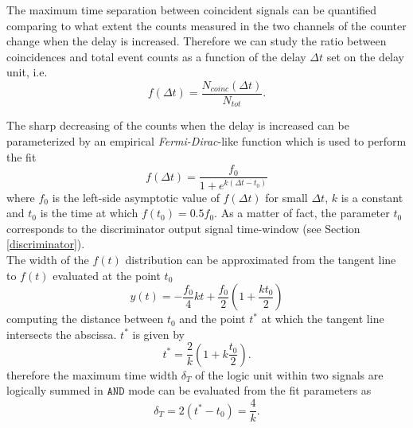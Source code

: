 The maximum time separation between coincident signals can be quantified comparing to what extent the counts measured in the two channels of the counter change when the delay is increased.
Therefore we can study the ratio between coincidences and total event counts as a function of the delay $\Delta t$ set on the delay unit, i.e.
\begin{equation} \label{eq:fermi_dirac}
f(\Delta t) = \frac{N_{coinc}(\Delta t)}{N_{tot}} .
\end{equation}

The sharp decreasing of the counts when the delay is increased can be parameterized by an empirical \emph{Fermi-Dirac}-like function which is used to perform the fit
\begin{equation} \label{eq:fermidirac}
f(\Delta t) = \frac{f_0}{1 + e^{k(\Delta t- t_0)}}
\end{equation}
where $f_0$ is the left-side asymptotic value of $f(\Delta t)$ for small $\Delta t$, $k$ is a constant and $t_0$ is the time at which $f(t_0) = 0.5 f_0$. As a matter of fact, the parameter $t_0$ corresponds to the discriminator output signal time-window (see Section \ref{discriminator}).\\

The width of the $f(t)$ distribution can be approximated from the tangent line to $f(t)$ evaluated at the point $t_0$
\begin{equation}
y(t) = - \frac{f_0}{4} k t + \frac{f_0}{2} \left(1 + \frac{k t_0}{2}\right)
\end{equation}
computing the distance between $t_0$ and the point $t^*$ at which the tangent line intersects the abscissa. $t^*$ is given by
\begin{equation}
t^* = \frac{2}{k} \left(1 + k \frac{t_0}{2}\right) .
\end{equation}
therefore the maximum time width $\delta_{T}$ of the logic unit within two signals are logically summed in $\texttt{AND}$ mode can be evaluated from the fit parameters as
\begin{equation}
\delta_{T} = 2 ( t^* - t_0 ) =  \frac{4}{k}.
\end{equation}

